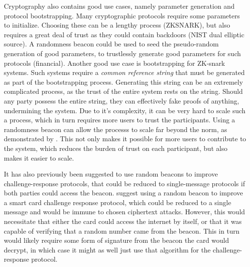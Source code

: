 Cryptography also contains  good use cases, namely parameter generation and protocol bootstrapping. Many cryptographic protocols require some parameters to initialize. Choosing these can be a lengthy process (ZKSNARK), but also requires a great deal of trust as they could contain backdoors (NIST dual elliptic source). A randomness beacon could be used to seed the pseudo-random generation of good parameters, to trustlessly generate good parameters for such protocols (financial).
Another good use case is bootstrapping for ZK-snark systems. Such systems require a \emph{common reference string} that must be generated as part of the bootstrapping process. Generating this string can be an extremely complicated process, as the trust of the entire system rests on the string. Should any party possess the entire string, they can effectively fake proofs of anything, undermining the system. Due to it's complexity, it can be very hard to scale such a process, which in turn requires more users to trust the participants. Using a randomness beacon can allow the processs to scale far beyond the norm, as demonstrated by \citet{mpcsnarks}. This not only makes it possible for more users to contribute to the system, which reduces the burden of trust on each participant, but also makes it easier to scale.

It has also previously been suggested to use random beacons to improve challenge-response protocols, that could be reduced to single-message protocols if both parties could access the beacon.
\citet{fischer2011publicrandomnessservice} suggest using a random beacon to improve a smart card challenge response protocol, which could be reduced to a single message and would be immune to chosen ciphertext attacks. However, this would necessitate that either the card could access the internet by itself, or that it was capable of verifying that a random number came from the beacon. This in turn would likely require some form of signature from the beacon the card would decrypt, in which case it might as well just use that algorithm for the challenge-response protocol. %








